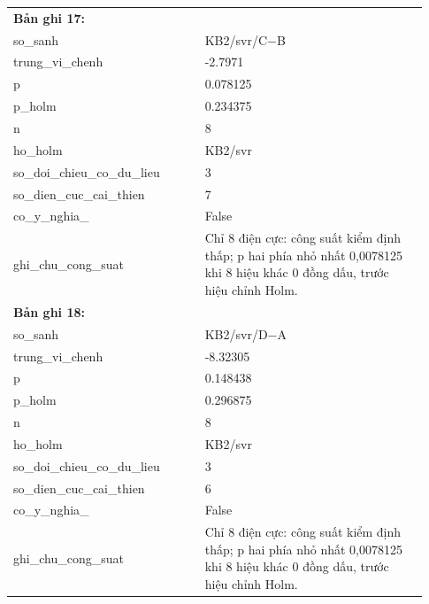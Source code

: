 \begin{longtable}{p{0.43\linewidth}p{0.50\linewidth}}
\midrule
\multicolumn{2}{p{0.95\linewidth}}{\textbf{Bản ghi 17: }} \\
so\_\allowbreak sanh & KB2/svr/C−B \\
trung\_\allowbreak vi\_\allowbreak chenh & -2.7971 \\
p & 0.078125 \\
p\_\allowbreak holm & 0.234375 \\
n & 8 \\
ho\_\allowbreak holm & KB2/svr \\
so\_\allowbreak doi\_\allowbreak chieu\_\allowbreak co\_\allowbreak du\_\allowbreak lieu & 3 \\
so\_\allowbreak dien\_\allowbreak cuc\_\allowbreak cai\_\allowbreak thien & 7 \\
co\_\allowbreak y\_\allowbreak nghia\_\allowbreak 005 & False \\
ghi\_\allowbreak chu\_\allowbreak cong\_\allowbreak suat & Chỉ 8 điện cực: công suất kiểm định thấp; p hai phía nhỏ nhất 0,0078125 khi 8 hiệu khác 0 đồng dấu, trước hiệu chỉnh Holm. \\
\midrule
\multicolumn{2}{p{0.95\linewidth}}{\textbf{Bản ghi 18: }} \\
so\_\allowbreak sanh & KB2/svr/D−A \\
trung\_\allowbreak vi\_\allowbreak chenh & -8.32305 \\
p & 0.148438 \\
p\_\allowbreak holm & 0.296875 \\
n & 8 \\
ho\_\allowbreak holm & KB2/svr \\
so\_\allowbreak doi\_\allowbreak chieu\_\allowbreak co\_\allowbreak du\_\allowbreak lieu & 3 \\
so\_\allowbreak dien\_\allowbreak cuc\_\allowbreak cai\_\allowbreak thien & 6 \\
co\_\allowbreak y\_\allowbreak nghia\_\allowbreak 005 & False \\
ghi\_\allowbreak chu\_\allowbreak cong\_\allowbreak suat & Chỉ 8 điện cực: công suất kiểm định thấp; p hai phía nhỏ nhất 0,0078125 khi 8 hiệu khác 0 đồng dấu, trước hiệu chỉnh Holm. \\
\midrule
\bottomrule
\end{longtable}
